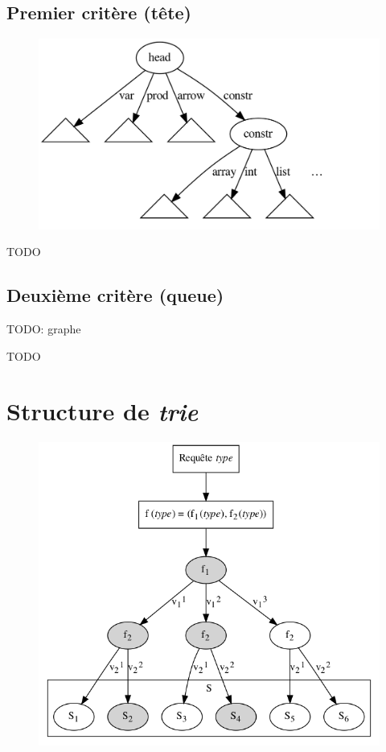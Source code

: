 \documentclass [a4paper] {report}
\theoremstyle {definition}
\newcommand {\trie} {\textit {trie}}
\begin{document}
\subsection {Premier critère (tête)}

\begin {figure} [h]
\begin {center}
	\includegraphics [scale=0.2] {graphs/by_head}
\end {center}
\end {figure}

TODO

\subsection {Deuxième critère (queue)}

TODO: graphe

TODO

\section {Structure de \trie}

\begin {figure} [h]
\begin {center}
	\includegraphics [scale=0.3] {graphs/trie}
\end {center}
\end {figure}
\end{document}

